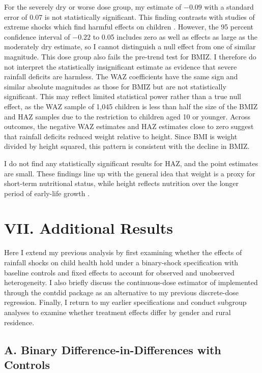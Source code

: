 For the severely dry or worse dose group, my estimate of $-0.09$ with a standard error of 0.07 is not statistically significant. This finding contrasts with studies of extreme shocks which find harmful effects on children \parencite{aldermanLongTermConsequences2006}. However, the 95 percent confidence interval of $-0.22$ to 0.05 includes zero as well as effects as large as the moderately dry estimate, so I cannot distinguish a null effect from one of similar magnitude. This dose group also fails the pre-trend test for BMIZ. I therefore do not interpret the statistically insignificant estimate as evidence that severe rainfall deficits are harmless. The WAZ coefficients have the same sign and similar absolute magnitudes as those for BMIZ but are not statistically significant. This may reflect limited statistical power rather than a true null effect, as the WAZ sample of 1,045 children is less than half the size of the BMIZ and HAZ samples due to the restriction to children aged 10 or younger. Across outcomes, the negative WAZ estimates and HAZ estimates close to zero suggest that rainfall deficits reduced weight relative to height. Since BMI is weight divided by height squared, this pattern is consistent with the decline in BMIZ.

I do not find any statistically significant results for HAZ, and the point estimates are small. These findings line up with the general idea that weight is a proxy for short-term nutritional status, while height reflects nutrition over the longer period of early-life growth \parencite{currieEarlyLifeHealthAdult2013}.

\section*{VII. Additional Results}\label{sec:VII}

Here I extend my previous analysis by first examining whether the effects of rainfall shocks on child health hold under a binary-shock specification with baseline controls and fixed effects to account for observed and unobserved heterogeneity. I also briefly discuss the continuous-dose estimator of \textcite{callawayDifferenceinDifferencesContinuousTreatment2024} implemented through the contdid package as an alternative to my previous discrete-dose regression. Finally, I return to my earlier specifications and conduct subgroup analyses to examine whether treatment effects differ by gender and rural residence.

\subsection*{A. Binary Difference-in-Differences with Controls}

